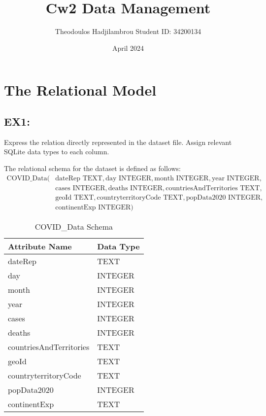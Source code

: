 \documentclass{article}
\title{Cw2 Data Management}
\author{Theodoulos Hadjilambrou Student ID: 34200134}
\date{April 2024}
\begin{document}
\maketitle
\section{The Relational Model}


\subsection{EX1:}  Express the relation directly represented in the dataset file. Assign relevant SQLite data types to each column.


\vspace{5mm}



The relational schema for the dataset is defined as follows:
\begin{align*}
\text{COVID\_Data}( & \text{dateRep TEXT}, \text{day INTEGER}, \text{month INTEGER}, \text{year INTEGER}, \\
                    & \text{cases INTEGER}, \text{deaths INTEGER}, \text{countriesAndTerritories TEXT}, \\
                    & \text{geoId TEXT}, \text{countryterritoryCode TEXT}, \text{popData2020 INTEGER}, \\
                    & \text{continentExp INTEGER})
\end{align*}
   
\vspace{10mm}

\begin{table}[htbp]
\centering
\caption{COVID\_Data Schema}
\label{tab:schema}
\begin{tabular}{@{}ll@{}}
\toprule
\textbf{Attribute Name}            & \textbf{Data Type} \\ \midrule
dateRep                            & TEXT               \\
day                                & INTEGER            \\
month                              & INTEGER            \\
year                               & INTEGER            \\
cases                              & INTEGER            \\
deaths                             & INTEGER            \\
countriesAndTerritories            & TEXT               \\
geoId                              & TEXT               \\
countryterritoryCode               & TEXT               \\
popData2020                        & INTEGER            \\
continentExp                       & TEXT               \\ \bottomrule
\end{tabular}
\end{table}
\end{document}
